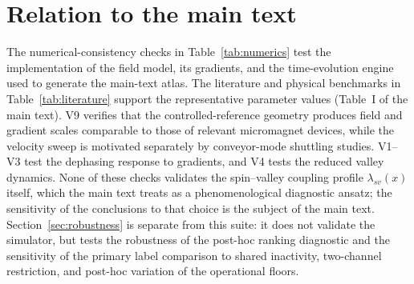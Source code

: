 \documentclass[aip,jap,reprint,onecolumn,superscriptaddress,longbibliography]{revtex4-2}
\begin{document}
\section{Relation to the main text}
The numerical-consistency checks in Table~\ref{tab:numerics} test the
implementation of the field model, its gradients, and the time-evolution engine
used to generate the main-text atlas. The literature and physical benchmarks in
Table~\ref{tab:literature} support the representative parameter values (Table~I
of the main text). V9 verifies that the controlled-reference geometry produces field
and gradient scales comparable to those of relevant micromagnet devices,
while the velocity sweep is motivated separately by conveyor-mode
shuttling studies. V1--V3 test the dephasing response to gradients, and
V4 tests the reduced valley dynamics. None of these checks
validates the spin--valley coupling profile $\lambda_{sv}(x)$ itself,
which the main text treats as a phenomenological diagnostic ansatz; the
sensitivity of the conclusions to that choice is the subject of the main text.
Section~\ref{sec:robustness} is separate from this suite: it does not validate
the simulator, but tests the robustness of the post-hoc ranking diagnostic and
the sensitivity of the primary label comparison to shared inactivity,
two-channel restriction, and post-hoc variation of the operational floors.

\clearpage


\end{document}
